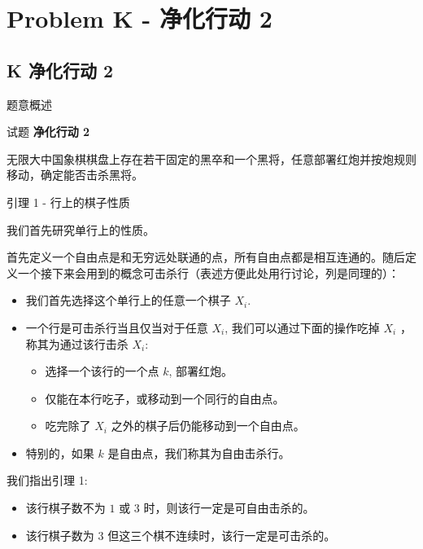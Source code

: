 \documentclass{beamer}
\newcommand{\TT}[1] {{\ttfamily #1}}
\newcommand{\BF}[1] {\textbf{#1}}
\begin{document}
{

\section[K]{Problem K - 净化行动 2}
\subsection{K 净化行动 2}

\begin{frame}{题意概述}

\begin{center}
试题 \myboxxi{      \BF{\TT{K}}} \BF{净化行动 2}
\end{center}

无限大中国象棋棋盘上存在若干固定的黑卒和一个黑将，任意部署红炮并按炮规则移动，确定能否击杀黑将。


\end{frame}


\begin{frame}{引理 1 - 行上的棋子性质}
  
我们首先研究单行上的性质。

首先定义一个自由点是和无穷远处联通的点，所有自由点都是相互连通的。随后定义一个接下来会用到的概念可击杀行（表述方便此处用行讨论，列是同理的）：

\begin{itemize}
  \item 我们首先选择这个单行上的任意一个棋子 $X_i$.
  \item 一个行是可击杀行当且仅当对于任意 $X_i$, 我们可以通过下面的操作吃掉 $X_i$ ，称其为通过该行击杀 $X_i$:
    \begin{itemize}
      \item 选择一个该行的一个点 $k$, 部署红炮。
      \item 仅能在本行吃子，或移动到一个同行的自由点。
      \item 吃完除了 $X_i$ 之外的棋子后仍能移动到一个自由点。
    \end{itemize}
  \item 特别的，如果 $k$ 是自由点，我们称其为自由击杀行。
\end{itemize}


我们指出引理 1:

\begin{itemize}
  \item 该行棋子数不为 $1$ 或 $3$ 时，则该行一定是可自由击杀的。
  \item 该行棋子数为 $3$ 但这三个棋不连续时，该行一定是可击杀的。
\end{itemize}




\end{frame}}
\end{document}
